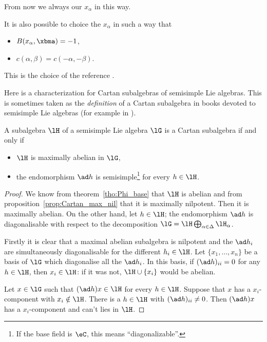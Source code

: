 From now we always our $ x_{\alpha}$ in this way.

\begin{remark}
	It is also possible to choice the $ x_{\alpha}$ in such a way that

	\begin{itemize}
		\item $B( x_{\alpha},\xbma)=-1$,
		\item $c(\alpha,\beta)=c(-\alpha,-\beta)$.
	\end{itemize}
	This is the choice of the reference \cite{Hochschild}.
\end{remark}


Here is a characterization for Cartan subalgebras of semisimple Lie algebras. This is sometimes taken as the \emph{definition} of a Cartan subalgebra in books devoted to semisimple Lie algebras (for example in \cite{Helgason}).
\begin{proposition}     \label{PropCartanMaxAnel}
	A subalgebra $\lH$ of a semisimple Lie algebra $\lG$ is a Cartan subalgebra if and only if
	\begin{itemize}
		\item $\lH$ is maximally abelian in $\lG$,
		\item the endomorphism $\ad h$ is semisimple\footnote{If the base field is \( \eC\), this means ``diagonalizable''.} for every $h\in\lH$.
	\end{itemize}
\end{proposition}

\begin{proof}
	 We know from theorem~\ref{tho:Phi_base} that $\lH$ is abelian and from proposition~\ref{prop:Cartan_max_nil} that it is maximally nilpotent. Then it is maximally abelian. On the other hand, let $h\in\lH$; the endomorphism $\ad h$ is diagonalisable with respect to the decomposition $\lG=\lH\bigoplus_{\alpha\in\Delta}\lH_{\alpha}$.

	Firstly it is clear that a maximal abelian subalgebra is nilpotent and the $\ad h_i$ are simultaneously diagonalisable for the different $h_i\in\lH$. Let $\{x_1,\ldots,x_n\}$ be a basis of $\lG$ which diagonalise all the $\ad h_i$. In this basis, if $(\ad h)_{ii}=0$ for any $h\in\lH$, then $x_i\in\lH$: if it was not, $\lH\cup\{x_i\}$ would be abelian.

	Let $x\in\lG$ such that $(\ad h)x\in\lH$ for every $h\in\lH$. Suppose that $x$ has a $x_i$-component with $x_i\notin\lH$. There is a $h\in\lH$ with $(\ad h)_{ii}\neq 0$. Then $(\ad h)x$ has a $x_i$-component and can't lies in $\lH$.

\end{proof}

